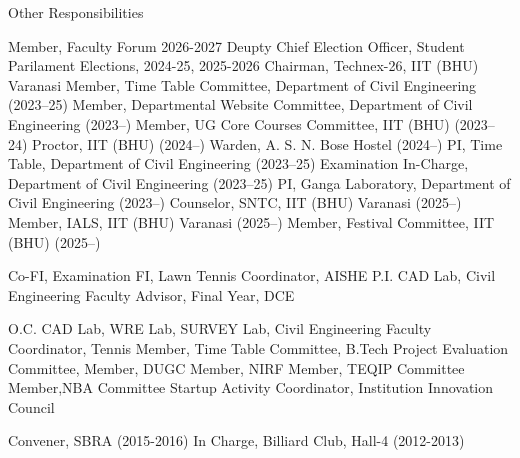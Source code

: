 \begin{rubric}{Other Responsibilities}

\entry*{} Member, Faculty Forum 2026-2027
\entry*{}Deupty Chief Election Officer, Student Parilament Elections, 2024-25, 2025-2026
\entry*{} Chairman, Technex-26, IIT (BHU) Varanasi 
\entry*{} Member, Time Table Committee, Department of Civil Engineering (2023–25)
\entry*{} Member, Departmental Website Committee, Department of Civil Engineering (2023–)
\entry*{} Member, UG Core Courses Committee, IIT (BHU) (2023–24)
\entry*{} Proctor, IIT (BHU) (2024–)
\entry*{} Warden, A. S. N. Bose Hostel (2024–)
\entry*{} PI, Time Table, Department of Civil Engineering (2023–25)
\entry*{} Examination In-Charge, Department of Civil Engineering (2023–25)
\entry*{} PI, Ganga Laboratory, Department of Civil Engineering (2023–)
\entry*{} Counselor, SNTC, IIT (BHU) Varanasi (2025–)
\entry*{} Member, IALS, IIT (BHU) Varanasi (2025–)
\entry*{} Member, Festival Committee, IIT (BHU) (2025–)


\entry*{} Co-FI, Examination
\entry*{} FI, Lawn Tennis
\entry*{} Coordinator, AISHE
\entry*{} P.I. CAD Lab, Civil Engineering
\entry*{} Faculty Advisor, Final Year, DCE

\entry*{} O.C. CAD Lab, WRE Lab, SURVEY Lab, Civil Engineering
\entry*{} Faculty Coordinator, Tennis
\entry*{} Member, Time Table Committee, 
\entry*{} B.Tech Project Evaluation Committee, 
\entry*{} Member, DUGC
\entry*{} Member, NIRF
\entry*{} Member, TEQIP Committee
\entry*{} Member,NBA Committee
\entry*{} Startup Activity Coordinator, Institution Innovation Council

\entry*{} Convener, SBRA (2015-2016)
\entry*{} In Charge, Billiard Club, Hall-4 (2012-2013)
\end{rubric}